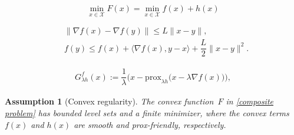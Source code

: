 \documentclass[10pt,a4paper]{amsart}
\newtheorem{assumption}{Assumption}
\begin{document}
            \begin{equation}\label{composite problem}
                \min_{x \in \mathcal{X}} F(x) = \min_{x \in \mathcal{X}} f(x)+h(x)
            \end{equation}

\begin{align}
    & \|\nabla f(x) - \nabla f(y)\| \leq L\|x-y\|, \label{eq2} \\
    & f(y) \leq f(x) + \langle \nabla f(x),y-x \rangle + \dfrac{L}{2} \|x-y\|^2. \label{eq1}
\end{align}

\begin{align}
\label{grad_mapping}
G^{f}_{\lambda h}(x) := \dfrac{1}{\lambda}\Big(x - \mathrm{prox}_{\lambda  h}\big(x - \lambda \nabla f(x)\big)\Big),   
\end{align}

\begin{assumption}[Convex regularity]\label{assum2}
The convex function~$F$ in \eqref{composite problem} has bounded level sets and a finite minimizer, where the convex terms~$f(x)$ and $h(x)$ are smooth and prox-friendly, respectively. 
\end{assumption}
\end{document}
